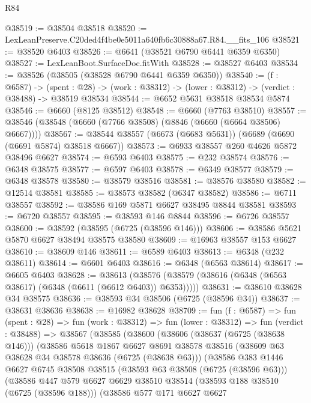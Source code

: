 \begin{lexlean}{R84}
\begin{coremodule}
@38519 := @38504 @38518
@38520 := LexLeanPreserve.C20ded4f4be0e5011a640fb6c30888a67.R84.__fits_106
@38521 := @38520 @6403
@38526 := @6641 (@38521 @6790 @6441 @6359 @6350)
@38527 := LexLeanBoot.SurfaceDoc.fitWith
@38528 := @38527 @6403
@38534 := @38526 (@38505 (@38528 @6790 @6441 @6359 @6350))
@38540 := (f : @6587) ->
  (spent : @28) -> (work : @38312) -> (lower : @38312) -> (verdict : @38488) -> @38519 @38534
@38544 := @6652 @5631 @38518 @38534 @5874
@38546 := @6660 (@8125 @38512)
@38548 := @6660 (@7763 @38510)
@38557 := @38546 (@38548 (@6660 (@7766 @38508) (@8846 (@6660 (@6664 @38506) @6667))))
@38567 := @38544 @38557 (@6673 (@6683 @5631)) (@6689 (@6690 (@6691 @5874) @38518 @6667))
@38573 := @6933 @38557 @260 @4626 @5872 @38496 @6627
@38574 := @6593 @6403
@38575 := @232 @38574
@38576 := @6348 @38575
@38577 := @6597 @6403
@38578 := @6349 @38577
@38579 := @6348 @38578
@38580 := @38579 @38516
@38581 := @38576 @38580
@38582 := @12514 @38581
@38585 := @38573 @38582 (@6347 @38582)
@38586 := @6711 @38557
@38592 := @38586 @169 @5871 @6627 @38495 @8844 @38581
@38593 := @6720 @38557
@38595 := @38593 @146 @8844
@38596 := @6726 @38557
@38600 := @38592 (@38595 (@6725 (@38596 @146)))
@38606 := @38586 @5621 @5870 @6627 @38494 @38575 @38580
@38609 := @16963 @38557 @153 @6627
@38610 := @38609 @146
@38611 := @6589 @6403
@38613 := @6348 (@232 @38611)
@38614 := @6601 @6403
@38616 := @6348 (@6563 @38614)
@38617 := @6605 @6403
@38628 := @38613
    (@38576 (@38579 (@38616 (@6348 (@6563 @38617) (@6348 (@6611 (@6612 @6403)) @6353)))))
@38631 := @38610 @38628 @34 @38575
@38636 := @38593 @34 @38506 (@6725 (@38596 @34))
@38637 := @38631 @38636
@38638 := @16982 @38628
@38709 := fun (f : @6587) =>
  fun (spent : @28) =>
  fun (work : @38312) =>
  fun (lower : @38312) =>
  fun (verdict : @38488) =>
  @38567
    (@38585
      (@38600
        (@38606
          (@38637 (@6725 (@38638 @146)))
          (@38586
            @5618
            @1867
            @6627
            @8691
            @38578
            @38516
            (@38609 @63 @38628 @34 @38578 @38636 (@6725 (@38638 @63)))
            (@38586
              @383
              @1446
              @6627
              @6745
              @38508
              @38515
              (@38593 @63 @38508 (@6725 (@38596 @63)))
              (@38586
                @447
                @579
                @6627
                @6629
                @38510
                @38514
                (@38593 @188 @38510 (@6725 (@38596 @188)))
                (@38586
                  @577
                  @171
                  @6627
                  @6627

\end{coremodule}
\end{lexlean}
